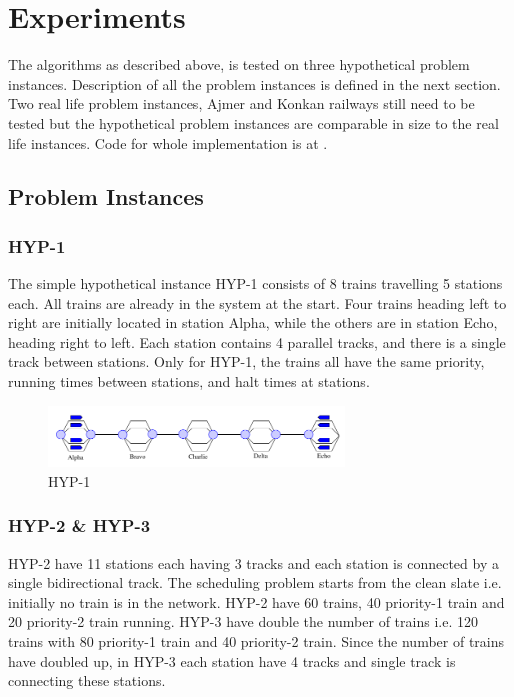\chapter {Experiments}

The algorithms as described above, is tested on three hypothetical problem instances. Description of all
the problem instances is defined in the next section. Two real life problem instances, Ajmer and Konkan 
railways still need to be tested but the hypothetical problem instances are comparable in size 
to the real life instances. Code for whole implementation is at \cite{WEBSITE:6}.

\section {Problem Instances}
\subsection{HYP-1}
The simple hypothetical instance HYP-1 consists of 8 trains
travelling 5 stations each. All trains are already
in the system at the start. Four trains heading left to right are
initially located in station Alpha, while the
others are in station Echo, heading right to left. Each station
contains 4 parallel tracks, and there is a single track between
stations. Only for HYP-1, the trains all have the same priority,
running times between stations, and halt times at stations.

\begin{figure}[h]
    \centering
    \includegraphics[width=0.7\textwidth]{Instance1}
    \caption{ HYP-1 \cite{ARTICLE:1} }
    \label{Instance1}
\end{figure}

\subsection{HYP-2 \& HYP-3}
HYP-2 have 11 stations each having 3 tracks and each station is connected by a single bidirectional track.
The scheduling problem starts from the clean slate i.e. initially no train is in the network.
HYP-2 have 60 trains, 40 priority-1 train and 20 priority-2 train running. HYP-3 have double the number of trains 
i.e. 120 trains with 80 priority-1 train and 40 priority-2 train. Since the number of trains have 
doubled up, in HYP-3 each station have 4 tracks and single track is connecting these stations.

